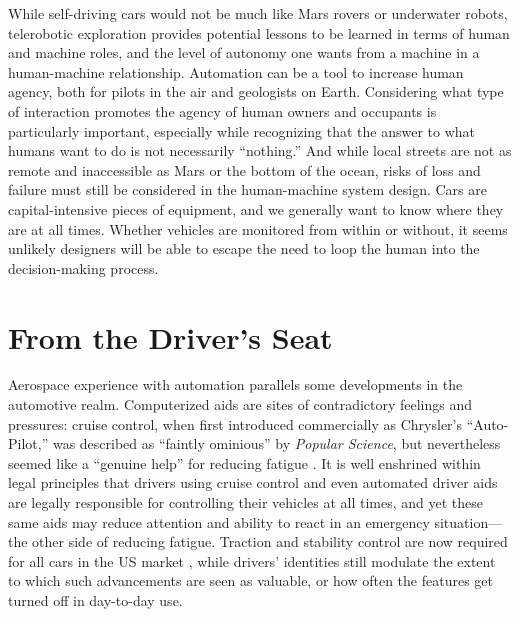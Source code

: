 While self-driving cars would not
be much like Mars rovers or underwater robots, telerobotic exploration
provides potential lessons
to be learned in terms of human and machine roles, and the level of
autonomy one wants from a machine in a human-machine relationship.
Automation can be a tool to increase 
human agency, both for pilots in the air and geologists on Earth.
Considering what type of interaction promotes the agency
of human owners and occupants is particularly important,
especially while recognizing that the answer to what humans want to do
is not necessarily ``nothing.'' And while local streets are not as
remote and inaccessible as Mars or the bottom of the ocean, risks of
loss and failure must still be considered in the human-machine system
design. Cars are capital-intensive pieces of equipment, and we
generally want to know where they are at all times. Whether vehicles
are monitored
from within or without, it seems unlikely designers will be able to
escape the need to loop the human into the decision-making process.


\section{From the Driver's Seat}

Aerospace experience with automation parallels some developments
in the automotive realm. Computerized aids are sites of contradictory
feelings and pressures: 
cruise control, when first introduced commercially as Chrysler's ``Auto-Pilot,''
was described as ``faintly
ominious'' by \emph{Popular Science}, but nevertheless seemed like a
``genuine help'' for reducing
fatigue \cite{rowsomePopsci}.
It is well enshrined within legal principles that drivers using
cruise control and even automated driver aids are legally responsible
for controlling their vehicles at all times, and yet these same aids
may reduce attention and ability to react in an emergency
situation---the other side of reducing fatigue.
Traction and stability control are now required for all cars in the US
market \cite{brookingsLiability}, while drivers' identities still modulate the
extent to which such
advancements are seen as valuable, or how often the features get
turned off in day-to-day use. 

